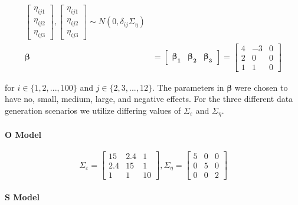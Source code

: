 \documentclass[
]{article}
\begin{document}
\begin{equation}
\begin{aligned}
\begin{bmatrix}
\eta_{ij1}\\
\eta_{ij2}\\
\eta_{ij3}
\end{bmatrix},
\begin{bmatrix}
\eta_{ij1}\\
\eta_{ij2}\\
\eta_{ij3}
\end{bmatrix} \sim N(0, \delta_{ij} \Sigma_\eta 
)\\
\boldsymbol{\beta} &= \begin{bmatrix} \boldsymbol{\beta_1} & \boldsymbol{\beta_2} &  \boldsymbol{\beta_3} \end{bmatrix} = 
\begin{bmatrix}
4 & -3 & 0\\
2 & 0 & 0\\
1 & 1 & 0
\end{bmatrix}
\end{aligned}
\end{equation}

for \(i \in \{1, 2, ..., 100\}\) and \(j \in \{2, 3,..., 12\}\). The parameters in \(\boldsymbol{\beta}\) were chosen to have no, small, medium, large, and negative effects. For the three different data generation scenarios we utilize differing values of \(\Sigma_\varepsilon\) and \(\Sigma_\eta\).

\hypertarget{o-model}{%
\paragraph{O Model}\label{o-model}}

\begin{equation}\label{eq:O}
\Sigma_\varepsilon = 
\begin{bmatrix}
15 & 2.4 & 1\\
2.4 & 15 & 1\\
1 & 1 & 10
\end{bmatrix},
\Sigma_\eta =
\begin{bmatrix}
5 & 0 & 0\\
0 & 5 & 0\\
0 & 0 & 2
\end{bmatrix}
\end{equation}

\hypertarget{s-model}{%
\paragraph{S Model}\label{s-model}}
\end{document}
